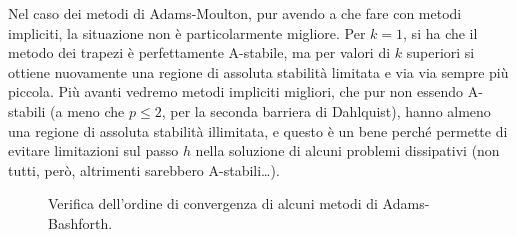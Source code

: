 Nel caso dei metodi di Adams-Moulton, pur avendo a che fare con metodi
impliciti, la situazione non è particolarmente migliore.
Per $k=1$, si ha che il metodo dei trapezi è perfettamente A-stabile,
ma per valori di $k$ superiori si ottiene nuovamente una regione di assoluta
stabilità limitata e via via sempre più piccola.
Più avanti vedremo metodi impliciti migliori, che pur non essendo
A-stabili (a meno che $p \leq 2$, per la seconda barriera di Dahlquist),
hanno almeno una regione di assoluta stabilità illimitata, e questo
è un bene perché permette di evitare limitazioni sul passo $h$
nella soluzione di alcuni problemi dissipativi (non tutti, però, altrimenti
sarebbero A-stabili\dots).

\begin{figure}[p]
\centering
{}
\caption{Verifica dell'ordine di convergenza di alcuni metodi di Adams-Bashforth.}
\label{fig:lmf-adams-bashforth-convergenza}
\end{figure}

